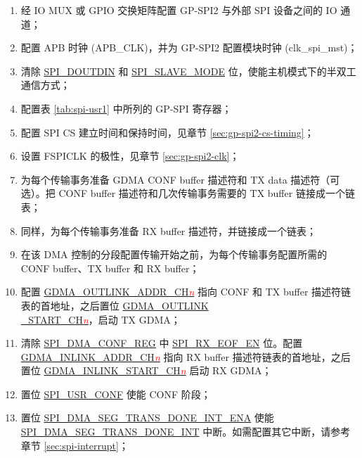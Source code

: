 \documentclass[main\_\_CN.tex]{subfiles}
\begin{document}
 \begin{enumerate}
    \item 经 IO MUX 或 GPIO 交换矩阵配置 GP-SPI2 与外部 SPI 设备之间的 IO 通道；
    \item 配置 APB 时钟 (APB\_CLK)，并为 GP-SPI2 配置模块时钟 (clk\_spi\_mst)；

    \item 清除  \hyperref[fielddesc:SPIDOUTDIN]{SPI\_DOUTDIN} 和  \hyperref[fielddesc:SPISLAVEMODE]{SPI\_SLAVE\_MODE} 位，使能主机模式下的半双工通信方式；

    \item 配置表  \ref{tab:spi-usr1} 中所列的 GP-SPI 寄存器；

    \item 配置 SPI CS 建立时间和保持时间，见章节  \ref{sec:gp-spi2-cs-timing}；

    \item 设置 FSPICLK 的极性，见章节  \ref{sec:gp-spi2-clk}；

   \item 为每个传输事务准备 GDMA CONF buffer 描述符和 TX data 描述符（可选）。把 CONF buffer 描述符和几次传输事务需要的 TX buffer 链接成一个链表；

   \item 同样，为每个传输事务准备 RX buffer 描述符，并链接成一个链表；
   \item 在该 DMA 控制的分段配置传输开始之前，为每个传输事务配置所需的 CONF buffer、TX buffer 和 RX buffer；

   \item 配置  \hyperref[fielddesc:DMAOUTLINKADDRCHN]{GDMA\_OUTLINK\_ADDR\_CH\textcolor{red}{\it{n}}}  指向 CONF 和 TX buffer 描述符链表的首地址，之后置位  \hyperref[fielddesc:DMAOUTLINKSTARTCHN]{GDMA\_OUTLINK\\\_START\_CH\textcolor{red}{\it{n}}}，启动 TX GDMA；

   \item 清除  \hyperref[regdesc:SPIDMACONFREG]{SPI\_DMA\_CONF\_REG} 中  \hyperref[fielddesc:SPIRXEOFEN]{SPI\_RX\_EOF\_EN} 位。配置  \hyperref[fielddesc:DMAINLINKADDRCHN]{GDMA\_INLINK\_ADDR\_CH\textcolor{red}{\it{n}}}  指向 RX buffer 描述符链表的首地址，之后置位  \hyperref[fielddesc:DMAINLINKSTARTCHN]{GDMA\_INLINK\_START\_CH\textcolor{red}{\it{n}}}  启动 RX GDMA；

   \item 置位  \hyperref[fielddesc:SPIUSRCONF]{SPI\_USR\_CONF} 使能 CONF 阶段；
   \item 置位  \hyperref[fielddesc:SPIDMASEGTRANSDONEINTENA]{SPI\_DMA\_SEG\_TRANS\_DONE\_INT\_ENA} 使能  \hyperref[int:SPIDMASEGTRANSDONEINT]{SPI\_DMA\_SEG\_TRANS\_DONE\_INT} 中断。如需配置其它中断，请参考章节  \ref{sec:spi-interrupt}；


\end{enumerate}
\end{document}
